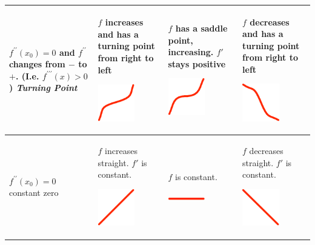 \begin{table}
{\begin{center}
\begin{tabular}{p{17mm}|p{25mm}|p{25mm}|p{25mm}}
\hline
\begin{raggedright}%
$f^{\prime\prime}(x_0)=0$
{\footnotesize
and $f^{\prime\prime}$ changes from $-$ to $+$. (I.e.
$f^{\prime\prime\prime}(x)>0$)}
{\em Turning Point}
\end{raggedright}&
\begin{raggedright}
$f$ increases and has a turning point
from right to left
\centerline{\includegraphics[width=16mm]{pic/CUL.png}}
\end{raggedright}&%
\begin{raggedright}
$f$ has a saddle point, increasing.
$f'$ stays positive
\centerline{\includegraphics[width=16mm]{pic/CSU.png}}
\end{raggedright}&%
\begin{raggedright}
$f$ decreases and has a turning point
from right to left
\centerline{\includegraphics[width=16mm]{pic/CDL.png}}
\end{raggedright}\\

\hline
$f^{\prime\prime}(x_0)=0$ constant zero&
\begin{raggedright}
$f$ increases straight. $f'$ is constant.
\centerline{\includegraphics[width=16mm]{pic/CIN.png}}
\end{raggedright}&%
\begin{raggedright}
$f$ is constant.
\centerline{\includegraphics[width=16mm]{pic/CCO.png}}
\end{raggedright}&%
\begin{raggedright}
$f$ decreases straight. $f'$ is constant.
\centerline{\includegraphics[width=16mm]{pic/CDE.png}}
\end{raggedright}
\\


\end{tabular}
\end{center}}
\end{table}

